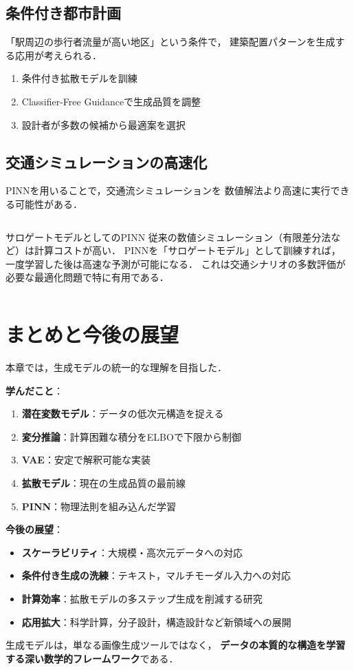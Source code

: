 \subsection{条件付き都市計画}

「駅周辺の歩行者流量が高い地区」という条件で，
建築配置パターンを生成する応用が考えられる．

\begin{enumerate}
  \item 条件付き拡散モデルを訓練
  \item Classifier-Free Guidanceで生成品質を調整
  \item 設計者が多数の候補から最適案を選択
\end{enumerate}

\subsection{交通シミュレーションの高速化}

PINNを用いることで，交通流シミュレーションを
数値解法より高速に実行できる可能性がある．

\begin{column}{サロゲートモデルとしてのPINN}
  従来の数値シミュレーション（有限差分法など）は計算コストが高い．
  PINNを「サロゲートモデル」として訓練すれば，
  一度学習した後は高速な予測が可能になる．
  これは交通シナリオの多数評価が必要な最適化問題で特に有用である．
\end{column}

\section{まとめと今後の展望}
\label{sec:generative-summary}

本章では，生成モデルの統一的な理解を目指した．

\textbf{学んだこと}：
\begin{enumerate}
  \item \textbf{潜在変数モデル}：データの低次元構造を捉える
  \item \textbf{変分推論}：計算困難な積分をELBOで下限から制御
  \item \textbf{VAE}：安定で解釈可能な実装
  \item \textbf{拡散モデル}：現在の生成品質の最前線
  \item \textbf{PINN}：物理法則を組み込んだ学習
\end{enumerate}

\textbf{今後の展望}：
\begin{itemize}
  \item \textbf{スケーラビリティ}：大規模・高次元データへの対応
  \item \textbf{条件付き生成の洗練}：テキスト，マルチモーダル入力への対応
  \item \textbf{計算効率}：拡散モデルの多ステップ生成を削減する研究
  \item \textbf{応用拡大}：科学計算，分子設計，構造設計など新領域への展開
\end{itemize}

生成モデルは，単なる画像生成ツールではなく，
\textbf{データの本質的な構造を学習する深い数学的フレームワーク}である．
